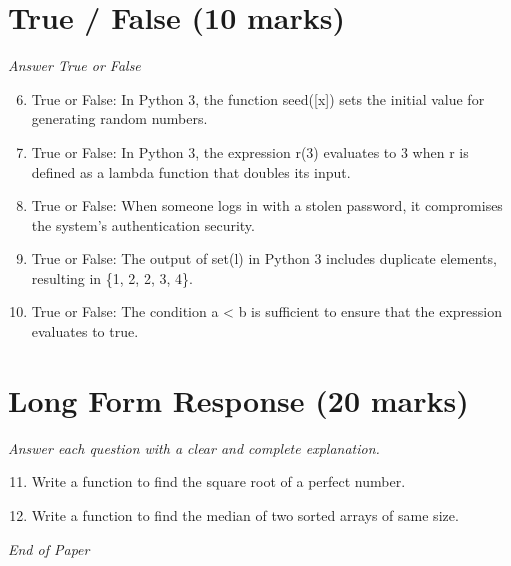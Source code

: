 \documentclass[12pt]{article}
\begin{document}
\section*{True / False (10 marks)}
\textit{Answer True or False}
\begin{enumerate}[label=\arabic*.]
\setcounter{enumi}{5}
\item True or False: In Python 3, the function seed([x]) sets the initial value for generating random numbers.
\item True or False: In Python 3, the expression r(3) evaluates to 3 when r is defined as a lambda function that doubles its input.
\item True or False: When someone logs in with a stolen password, it compromises the system's authentication security.
\item True or False: The output of set(l) in Python 3 includes duplicate elements, resulting in \{1, 2, 2, 3, 4\}.
\item True or False: The condition a \textless{} b is sufficient to ensure that the expression evaluates to true.
\end{enumerate}

\section*{Long Form Response (20 marks)}
\textit{Answer each question with a clear and complete explanation.}
\begin{enumerate}[label=\arabic*.]
\setcounter{enumi}{10}
\item Write a function to find the square root of a perfect number.
\item Write a function to find the median of two sorted arrays of same size.
\end{enumerate}

\vfill
\noindent\textit{End of Paper}
\end{document}
